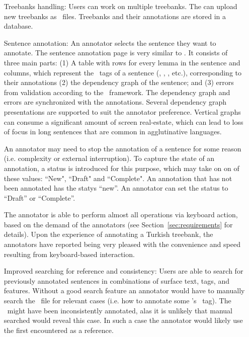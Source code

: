 \begin{itemize}[before=\normalfont, font=\itshape, align=left]
    \item[Treebanks handling:]
        Users can work on multiple treebanks.
        The can upload new treebanks as \conllu\ files.
        Treebanks and their annotations are stored in a database.

    \item[Sentence annotation:]
    	An annotator selects the sentence they want to annotate. 
        The sentence annotation page is very similar to \boatvone.
        It consists of three main parts: (1) A table with rows for every lemma in the sentence and columns, which represent the \ud\ tags of a sentence (\form, \lemma, \deprel, etc.), corresponding to their annotations (2) the dependency graph of the sentence; and (3) errors from validation according to the \ud\ framework.
        The dependency graph and errors are synchronized with the annotations.
        Several dependency graph presentations are supported to suit the annotator preference.
        Vertical graphs can consume a significant amount of screen real-estate, which can lead to loss of focus in long sentences that are common in agglutinative languages.

        An annotator may need to stop the annotation of a sentence for some reason (i.e. complexity or external interruption).
        To capture the state of an annotation, a status is introduced for this purpose, which may take on on of these values: ``New", ``Draft" and ``Complete". 
        An annotation that has not been annotated has the statys ``new''. 
	An annotator can set the status to ``Draft'' or ``Complete''. 

        The annotator is able to perform almost all operations via keyboard action, based on the demand of the annotators (see Section~\ref{sec:requirements} for details).
        Upon the experience of annotating a Turkish treebank, the annotators have reported being very pleased with the convenience and speed resulting from keyboard-based interaction.

    \item[Improved searching for reference and consistency:]
        Users are able to search for previously annotated sentences in combinations of surface text, tags, and features. 
		Without a good search feature an annotator would have to manually search the \conllu\ file for relevant cases (i.e. how to annotate some \form's \upos\ tag).
		The \form\ might have been inconsistently annotated, alas it is unlikely that manual searched would reveal this case. 
		In such a case the annotator would likely use the first encountered as a reference. 


\end{itemize}

